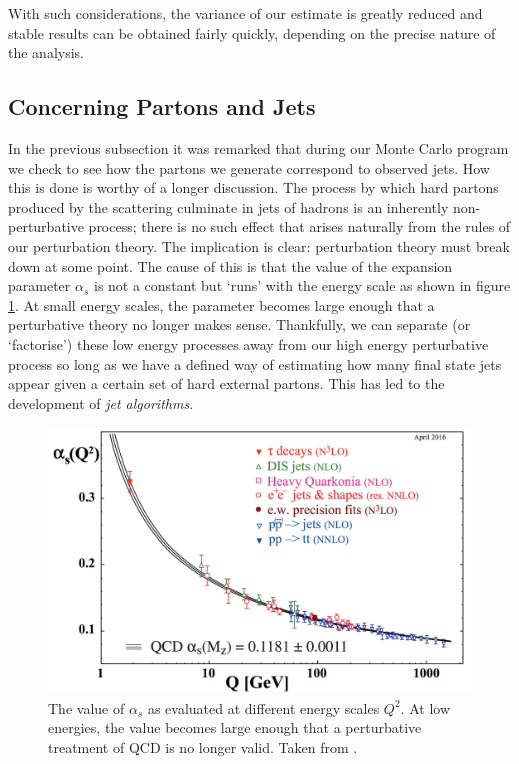 With such considerations, the variance of our estimate is greatly reduced and stable results can be obtained fairly quickly, depending on the precise nature of the analysis. 

\subsection{Concerning Partons and Jets}
In the previous subsection it was remarked that during our Monte Carlo program we check to see how the partons we generate correspond to observed jets. How this is done is worthy of a longer discussion. The process by which hard partons produced by the scattering culminate in jets of hadrons is an inherently non-perturbative process; there is no such effect that arises naturally from the rules of our perturbation theory. The implication is clear: perturbation theory must break down at some point. The cause of this is that the value of the expansion parameter $\alpha_s$ is not a constant but `runs' with the energy scale as shown in figure \ref{fig:alphas}. At small energy scales, the parameter becomes large enough that a perturbative theory no longer makes sense. Thankfully, we can separate (or `factorise') these low energy processes away from our high energy perturbative process so long as we have a defined way of estimating how many final state jets appear given a certain set of hard external partons. This has led to the development of \emph{jet algorithms}. 

\begin{figure}[t]
\centering
\includegraphics[scale=0.3]{Images/running_alphas.png} 
\caption{The value of $\alpha_s$ as evaluated at different energy scales $Q^2$. At low energies, the value becomes large enough that a perturbative treatment of QCD is no longer valid. Taken from \cite{Hagiwara2002}.}
\label{fig:alphas}
\end{figure}


